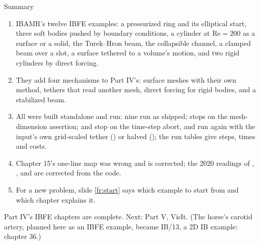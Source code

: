 \documentclass[aspectratio=169,11pt]{beamer}
\begin{document}
\begin{frame}{Summary}
\label{fr:summary}
\footnotesize
\begin{enumerate}
  \item IBAMR's twelve IBFE examples: a pressurized ring and its elliptical start, three soft bodies pushed by boundary conditions, a cylinder at $\mathrm{Re} = 200$ as a surface or a solid, the Turek--Hron beam, the collapsible channel, a clamped beam over a slot, a surface tethered to a volume's motion, and two rigid cylinders by direct forcing.
  \item They add four mechanisms to Part IV's: surface meshes with their own method, tethers that read another mesh, direct forcing for rigid bodies, and a stabilized beam.
  \item All were built standalone and run: nine run as shipped;  stops on the mesh-dimension assertion;  and  stop on the time-step abort, and run again with the input's own grid-scaled tether () or  halved (); the run tables give steps, times and costs.
  \item Chapter 15's one-line map was wrong and is corrected; the 2020 readings of , ,  and  are corrected from the code.
  \item For a new problem, slide \ref{fr:start} says which example to start from and which chapter explains it.
\end{enumerate}
\begin{homebox}
\footnotesize Part IV's IBFE chapters are complete. Next: Part V, VisIt. (The horse's carotid artery, planned here as an IBFE example, became IB/13, a 2D IB example: chapter 36.)
\end{homebox}
\end{frame}
\end{document}
